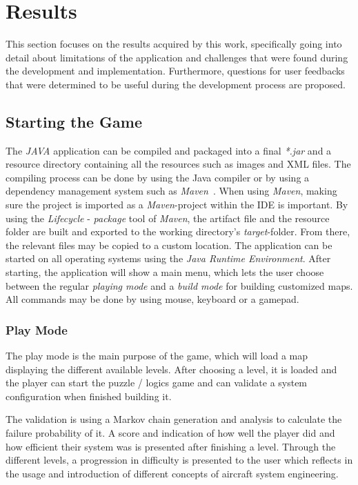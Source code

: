 \chapter{Results}\label{ch:results}
This section focuses on the results acquired by this work, specifically going into detail about
limitations of the application and challenges that were found during the development and implementation.
Furthermore, questions for user feedbacks that were determined to be useful during the development process are proposed.
\section{Starting the Game}\label{sec:starting-the-game}
The \textit{JAVA} application can be compiled and packaged into a final \textit{*.jar} and a resource directory containing
all the resources such as images and \gls{XML} files.
The compiling process can be done by using the Java compiler or by using a dependency management system such
as \textit{Maven}~\cite{maven}.
When using \textit{Maven}, making sure the project is imported as a \textit{Maven}-project within the \gls{IDE} is
important.
By using the \textit{Lifecycle} - \textit{package} tool of \textit{Maven}, the artifact file and the resource folder are
built and exported to the working directory's \textit{target}-folder.
From there, the relevant files may be copied to a custom location.
The application can be started on all operating systems using the \textit{Java Runtime Environment}.
After starting, the application will show a main menu, which lets the user choose between the regular \textit{playing mode} and a
\textit{build mode} for building customized maps.
All commands may be done by using mouse, keyboard or a gamepad.
\subsection{Play Mode}\label{subsec:play-mode}
The play mode is the main purpose of the game, which will load a map displaying the different available levels.
After choosing a level, it is loaded and the player can start the puzzle / logics game and can validate a system
configuration when finished building it.

The validation is using a Markov chain generation and analysis to calculate the failure probability of it.
A score and indication of how well the player did and how efficient their system was is presented after finishing a level.
Through the different levels, a progression in difficulty is presented to the user which reflects in the usage and introduction
of different concepts of aircraft system engineering.
